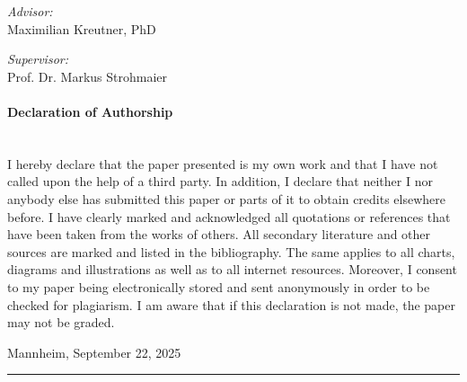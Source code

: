 \begin{titlepage}
\vfill\vfill\vfill
{ \large \center 
\textit{Advisor:}\\
Maximilian Kreutner, PhD
}

\vfill
{ \large \center 
\textit{Supervisor:}\\
Prof. Dr. Markus Strohmaier 
}


 
\vfill %
\end{titlepage}

\cleardoublepage

\newpage
\paragraph{Declaration of Authorship}\mbox{}\\

\noindent I hereby declare that the paper presented is my own work and that I have not called upon the help of a third party. In addition, I declare that neither I nor anybody else has submitted this paper or parts of it to obtain credits elsewhere before. I have clearly marked and acknowledged all quotations or references that have been taken from the works of others. All secondary literature and other sources are marked and listed in the bibliography. The same applies to all charts, diagrams and illustrations as well as to all internet resources. Moreover, I consent to my paper being electronically stored and sent anonymously in order to be checked for plagiarism. I am aware that if this declaration is not made, the paper may not be graded.

\vspace{4em}
\noindent Mannheim, September 22, 2025 \hfill\rule{5cm}{0.4pt} \\

\cleardoublepage

